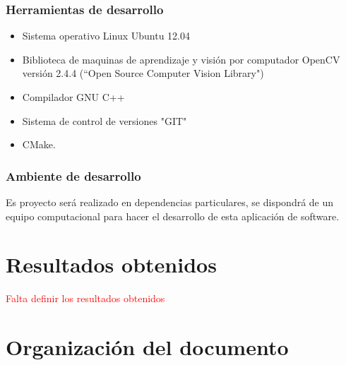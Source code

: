 \subsubsection{Herramientas de desarrollo}

\begin{itemize}
\item Sistema operativo Linux Ubuntu 12.04
\item Biblioteca de maquinas de aprendizaje y visión por computador OpenCV versión 2.4.4 (``Open Source Computer Vision Library")
\item Compilador GNU C++
\item Sistema de control de versiones "GIT"
\item CMake.
\end{itemize}

\subsubsection{Ambiente de desarrollo}

\indent Es proyecto será realizado en dependencias particulares, se dispondrá de un equipo computacional para hacer el desarrollo de esta aplicación de software.





\section{Resultados obtenidos}

\textcolor{red}{Falta definir los resultados obtenidos}

\section{Organización del documento}

